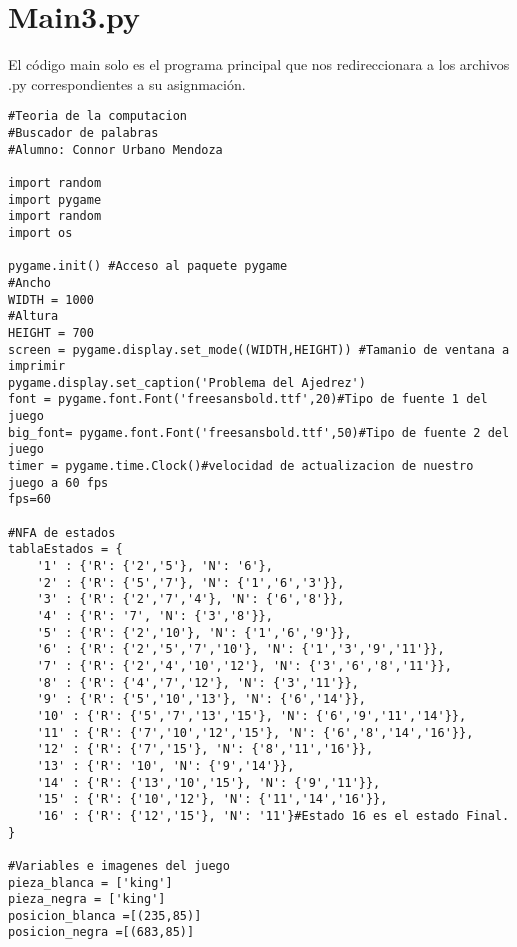 \section{Main3.py}
El código main solo es el programa principal que nos redireccionara a los archivos .py correspondientes a su asignmación. \newline
\\
\begin{lstlisting}
#Teoria de la computacion
#Buscador de palabras
#Alumno: Connor Urbano Mendoza

import random
import pygame
import random
import os

pygame.init() #Acceso al paquete pygame
#Ancho
WIDTH = 1000
#Altura
HEIGHT = 700
screen = pygame.display.set_mode((WIDTH,HEIGHT)) #Tamanio de ventana a imprimir
pygame.display.set_caption('Problema del Ajedrez')
font = pygame.font.Font('freesansbold.ttf',20)#Tipo de fuente 1 del juego
big_font= pygame.font.Font('freesansbold.ttf',50)#Tipo de fuente 2 del juego
timer = pygame.time.Clock()#velocidad de actualizacion de nuestro juego a 60 fps
fps=60

#NFA de estados
tablaEstados = {
    '1' : {'R': {'2','5'}, 'N': '6'},
    '2' : {'R': {'5','7'}, 'N': {'1','6','3'}},
    '3' : {'R': {'2','7','4'}, 'N': {'6','8'}},
    '4' : {'R': '7', 'N': {'3','8'}},
    '5' : {'R': {'2','10'}, 'N': {'1','6','9'}},
    '6' : {'R': {'2','5','7','10'}, 'N': {'1','3','9','11'}},
    '7' : {'R': {'2','4','10','12'}, 'N': {'3','6','8','11'}},
    '8' : {'R': {'4','7','12'}, 'N': {'3','11'}},
    '9' : {'R': {'5','10','13'}, 'N': {'6','14'}},
    '10' : {'R': {'5','7','13','15'}, 'N': {'6','9','11','14'}},
    '11' : {'R': {'7','10','12','15'}, 'N': {'6','8','14','16'}},
    '12' : {'R': {'7','15'}, 'N': {'8','11','16'}},
    '13' : {'R': '10', 'N': {'9','14'}},
    '14' : {'R': {'13','10','15'}, 'N': {'9','11'}},
    '15' : {'R': {'10','12'}, 'N': {'11','14','16'}},
    '16' : {'R': {'12','15'}, 'N': '11'}#Estado 16 es el estado Final.
}

#Variables e imagenes del juego
pieza_blanca = ['king']
pieza_negra = ['king']
posicion_blanca =[(235,85)]
posicion_negra =[(683,85)]


\end{lstlisting}
